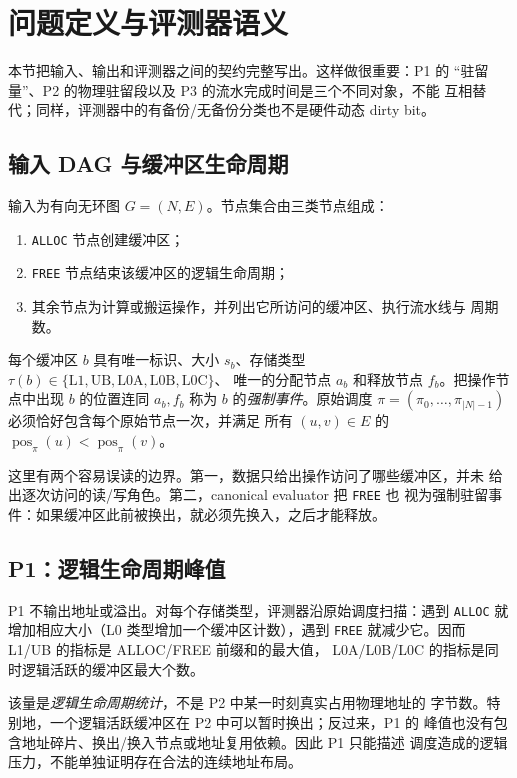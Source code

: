 \section{问题定义与评测器语义}\label{sec:supp-problem-zh}

本节把输入、输出和评测器之间的契约完整写出。这样做很重要：P1 的
``驻留量''、P2 的物理驻留段以及 P3 的流水完成时间是三个不同对象，不能
互相替代；同样，评测器中的有备份/无备份分类也不是硬件动态 dirty bit。

\subsection{输入 DAG 与缓冲区生命周期}

输入为有向无环图 $G=(N,E)$。节点集合由三类节点组成：
\begin{enumerate}
  \item \texttt{ALLOC} 节点创建缓冲区；
  \item \texttt{FREE} 节点结束该缓冲区的逻辑生命周期；
  \item 其余节点为计算或搬运操作，并列出它所访问的缓冲区、执行流水线与
        周期数。
\end{enumerate}
每个缓冲区 $b$ 具有唯一标识、大小 $s_b$、存储类型
$\tau(b)\in\{\mathrm{L1},\mathrm{UB},\mathrm{L0A},\mathrm{L0B},\mathrm{L0C}\}$、
唯一的分配节点 $a_b$ 和释放节点 $f_b$。把操作节点中出现 $b$ 的位置连同
$a_b,f_b$ 称为 $b$ 的\emph{强制事件}。原始调度
$\pi=(\pi_0,\ldots,\pi_{|N|-1})$ 必须恰好包含每个原始节点一次，并满足
所有 $(u,v)\in E$ 的 $\operatorname{pos}_\pi(u)<\operatorname{pos}_\pi(v)$。

这里有两个容易误读的边界。第一，数据只给出操作访问了哪些缓冲区，并未
给出逐次访问的读/写角色。第二，canonical evaluator 把 \texttt{FREE} 也
视为强制驻留事件：如果缓冲区此前被换出，就必须先换入，之后才能释放。

\subsection{P1：逻辑生命周期峰值}

P1 不输出地址或溢出。对每个存储类型，评测器沿原始调度扫描：遇到
\texttt{ALLOC} 就增加相应大小（L0 类型增加一个缓冲区计数），遇到
\texttt{FREE} 就减少它。因而 L1/UB 的指标是 ALLOC/FREE 前缀和的最大值，
L0A/L0B/L0C 的指标是同时逻辑活跃的缓冲区最大个数。

该量是\emph{逻辑生命周期统计}，不是 P2 中某一时刻真实占用物理地址的
字节数。特别地，一个逻辑活跃缓冲区在 P2 中可以暂时换出；反过来，P1 的
峰值也没有包含地址碎片、换出/换入节点或地址复用依赖。因此 P1 只能描述
调度造成的逻辑压力，不能单独证明存在合法的连续地址布局。

